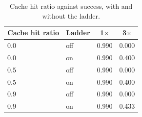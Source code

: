 \begin{table}[t]
\centering
\footnotesize
\caption{Cache hit ratio against success, with and without the ladder.}
\label{tab:p2-cache}
\begin{tabular}{llcc}
\toprule
Cache hit ratio & Ladder & 1$\times$ & 3$\times$ \\
\midrule
0.0 & off & 0.990 & 0.000 \\
0.0 & on & 0.990 & 0.400 \\
0.5 & off & 0.990 & 0.000 \\
0.5 & on & 0.990 & 0.400 \\
0.9 & off & 0.990 & 0.000 \\
0.9 & on & 0.990 & 0.433 \\
\bottomrule
\end{tabular}
\par\vspace{2pt}{\footnotesize\raggedright A hit removes context bytes from the request, so it can only help where bytes bind. Without the ladder success is zero at $3\times$ regardless of the hit ratio; with it, the top hit ratio buys 3.3 points.\par}
\end{table}
